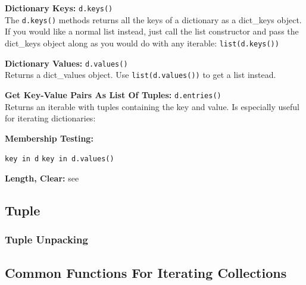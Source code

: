 \begin{indentblock}
            \textbf{Dictionary Keys:} \texttt{d.keys()} \\
            The \texttt{d.keys()} methods returns all the keys of a dictionary as a
            dict\_keys
            object. If you would like a normal list instead, just call the list constructor and pass
            the dict\_keys object along as you would do with any iterable:
            \texttt{list(d.keys())}

            \textbf{Dictionary Values:} \texttt{d.values()} \\
            Returns a dict\_values object. Use \texttt{list(d.values())} to get a list
            instead.

            \textbf{Get Key-Value Pairs As List Of Tuples:} \texttt{d.entries()} \\
            Returns an iterable with tuples containing the key and value.
            Is especially useful for iterating dictionaries:


            \textbf{Membership Testing:}
            \begin{itemize}
                 \texttt{key in d}
                 \texttt{key in d.values()}
            \end{itemize}

            \textbf{Length, Clear:} see 

        \end{indentblock}


    \subsection{Tuple}

        \subsubsection{Tuple Unpacking}

    \subsection{Common Functions For Iterating Collections}
